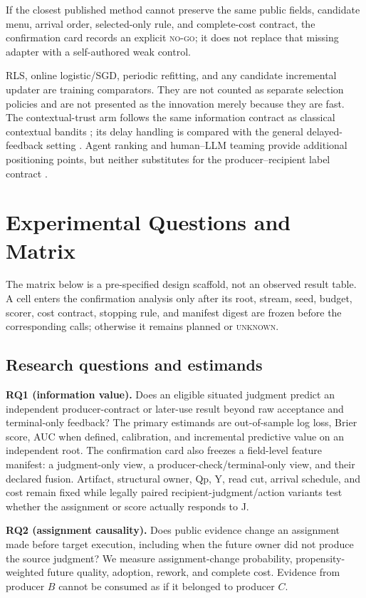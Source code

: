 \documentclass[sigconf,anonymous]{aamas}
\newcommand{\unknown}{\textsc{unknown}}
\begin{document}
If the closest published method cannot preserve the same public fields, candidate menu,
arrival order, selected-only rule, and complete-cost contract, the confirmation card records
an explicit \textsc{no-go}; it does not replace that missing adapter with a self-authored
weak control.

RLS, online logistic/SGD, periodic refitting, and any candidate incremental updater are training comparators. They are not counted as separate selection policies and are not presented as the innovation merely because they are fast. The contextual-trust arm follows the same information contract as classical contextual bandits \cite{li2010contextual}; its delay handling is compared with the general delayed-feedback setting \cite{joulani2013delayed}. Agent ranking and human--LLM teaming provide additional positioning points, but neither substitutes for the producer--recipient label contract \cite{lanctot2025soft,yurrita2026guidelines}.

\section{Experimental Questions and Matrix}
\label{sec:experiments}

The matrix below is a pre-specified design scaffold, not an observed result table. A cell enters
the confirmation analysis only after its root, stream, seed, budget, scorer, cost contract,
stopping rule, and manifest digest are frozen before the corresponding calls; otherwise it
remains planned or \unknown{}.

\subsection{Research questions and estimands}
\textbf{RQ1 (information value).} Does an eligible situated judgment predict an independent producer-contract or later-use result beyond raw acceptance and terminal-only feedback? The primary estimands are out-of-sample log loss, Brier score, AUC when defined, calibration, and incremental predictive value on an independent root. The confirmation card also freezes a field-level feature manifest: a judgment-only view, a producer-check/terminal-only view, and their declared fusion. Artifact, structural owner, Qp, Y, read cut, arrival schedule, and cost remain fixed while legally paired recipient-judgment/action variants test whether the assignment or score actually responds to J.

\textbf{RQ2 (assignment causality).} Does public evidence change an assignment made before target execution, including when the future owner did not produce the source judgment? We measure assignment-change probability, propensity-weighted future quality, adoption, rework, and complete cost. Evidence from producer $B$ cannot be consumed as if it belonged to producer $C$.
\end{document}
